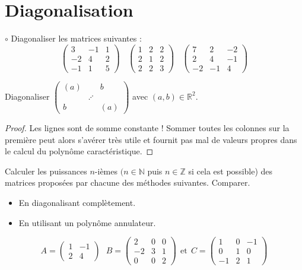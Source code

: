 \documentclass[french,a4paper]{article}
\newcommand{\N}{\mathbb{N}}
\newcommand{\Z}{\mathbb{Z}}
\newcommand{\R}{\mathbb{R}}
\theoremstyle{plain}
\theoremstyle{definition}
\theoremstyle{remark}
\begin{document}
\section{Diagonalisation}

\begin{ex}{$\circ$}
	Diagonaliser les matrices suivantes : 
	$$\begin{pmatrix}
		3&-1&1\\
		-2&4&2\\
		-1&1&5
	\end{pmatrix}\ \ \ \
	\begin{pmatrix}
		1&2&2\\
		2&1&2\\
		2&2&3
	\end{pmatrix}\ \ \ \
	\begin{pmatrix}
		7&2&-2\\
		2&4&-1\\
		-2&-1&4
	\end{pmatrix}$$
\end{ex}

\begin{ex}{}
	Diagonaliser $\displaystyle\begin{pmatrix}
		(a)&&b\\
		&\iddots&\\
		b&&(a)
	\end{pmatrix}$ avec $(a,b)\in\R^2$.
\end{ex}
\begin{proof}
	Les lignes sont de somme constante ! Sommer toutes les colonnes sur la première peut alors s'avérer très utile et fournit pas mal de valeurs propres dans le calcul du polynôme caractéristique.
\end{proof}

\begin{ex}{}
	Calculer les puissances $n$-ièmes $(n\in\N$ puis $n\in\Z$ si cela est possible) des matrices proposées par chacune des méthodes suivantes. Comparer.
	\begin{itemize}
		\item En diagonalisant complètement.
		\item En utilisant un polynôme annulateur.
	\end{itemize}
	$$A=\begin{pmatrix}
		1&-1\\
		2&4
	\end{pmatrix}\ \ \ B=\begin{pmatrix}
	2&0&0\\
	-2&3&1\\
	0&0&2
	\end{pmatrix}\ \ \text{et}\ \ C=\begin{pmatrix}
	1&0&-1\\
	0&1&0\\
	-1&2&1
	\end{pmatrix}$$
\end{ex}
\end{document}
